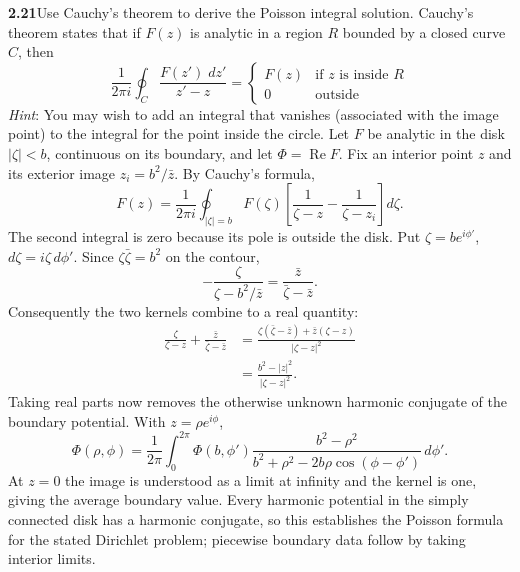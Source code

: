 \par\bigskip
\noindent\textbf{2.21}\quad Use Cauchy's theorem to derive the Poisson integral solution. Cauchy's theorem states that if $F(z)$ is analytic in a region $R$ bounded by a closed curve $C$, then
\[
\frac{1}{2\pi i}\oint_{C}\frac{F(z')\;dz'}{z'-z}=\begin{cases}F(z) & \text{if $z$ is inside } R\\ 0 & \text{outside}\end{cases}
\]
\emph{Hint}: You may wish to add an integral that vanishes (associated with the image point) to the integral for the point inside the circle.
\solution
Let $F$ be analytic in the disk $|\zeta|<b$, continuous on its
boundary, and let $\Phi=\operatorname{Re}F$. Fix an interior point
$z$ and its exterior image $z_i=b^2/\bar z$. By Cauchy's formula,
\[
F(z)=\frac1{2\pi i}\oint_{|\zeta|=b}
 F(\zeta)\left[\frac1{\zeta-z}-\frac1{\zeta-z_i}\right]d\zeta.
\]
The second integral is zero because its pole is outside the disk.
Put $\zeta=be^{i\phi'}$, $d\zeta=i\zeta\,d\phi'$. Since
$\zeta\bar\zeta=b^2$ on the contour,
\[
-\frac\zeta{\zeta-b^2/\bar z}
=\frac{\bar z}{\bar\zeta-\bar z}.
\]
Consequently the two kernels combine to a real quantity:
\begin{align*}
\frac\zeta{\zeta-z}+\frac{\bar z}{\bar\zeta-\bar z}
&=\frac{\zeta(\bar\zeta-\bar z)+\bar z(\zeta-z)}{|\zeta-z|^2}\\
&=\frac{b^2-|z|^2}{|\zeta-z|^2}.
\end{align*}
Taking real parts now removes the otherwise unknown harmonic
conjugate of the boundary potential. With $z=\rho e^{i\phi}$,
\[
\boxed{\Phi(\rho,\phi)=\frac1{2\pi}\int_0^{2\pi}
 \Phi(b,\phi')\frac{b^2-\rho^2}
 {b^2+\rho^2-2b\rho\cos(\phi-\phi')}\,d\phi'.}
\]
At $z=0$ the image is understood as a limit at infinity and the
kernel is one, giving the average boundary value. Every harmonic
potential in the simply connected disk has a harmonic conjugate,
so this establishes the Poisson formula for the stated Dirichlet
problem; piecewise boundary data follow by taking interior limits.

